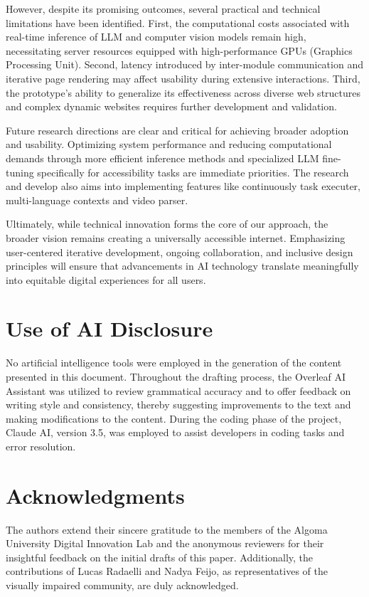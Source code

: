 \documentclass[conference]{IEEEtran}
\begin{document}
However, despite its promising outcomes, several practical and technical limitations have been identified. First, the computational costs associated with real-time inference of LLM and computer vision models remain high, necessitating server resources equipped with high-performance GPUs (Graphics Processing Unit). Second, latency introduced by inter-module communication and iterative page rendering may affect usability during extensive interactions. Third, the prototype's ability to generalize its effectiveness across diverse web structures and complex dynamic websites requires further development and validation.

Future research directions are clear and critical for achieving broader adoption and usability. Optimizing system performance and reducing computational demands through more efficient inference methods and specialized LLM fine-tuning specifically for accessibility tasks are immediate priorities. The research and develop also aims into implementing features like continuously task executer, multi-language contexts and video parser.

Ultimately, while technical innovation forms the core of our approach, the broader vision remains creating a universally accessible internet. Emphasizing user-centered iterative development, ongoing collaboration, and inclusive design principles will ensure that advancements in AI technology translate meaningfully into equitable digital experiences for all users.


\section{Use of AI Disclosure}\label{ai-disclosure}
No artificial intelligence tools were employed in the generation of the content presented in this document. Throughout the drafting process, the Overleaf AI Assistant was utilized to review grammatical accuracy and to offer feedback on writing style and consistency, thereby suggesting improvements to the text and making modifications to the content. During the coding phase of the project, Claude AI, version 3.5, was employed to assist developers in coding tasks and error resolution.


\section{Acknowledgments}\label{ai-disclosure}
The authors extend their sincere gratitude to the members of the Algoma University Digital Innovation Lab and the anonymous reviewers for their insightful feedback on the initial drafts of this paper. Additionally, the contributions of Lucas Radaelli and Nadya Feijo, as representatives of the visually impaired community, are duly acknowledged.



\end{document}
